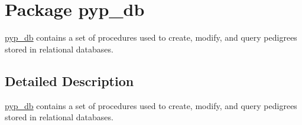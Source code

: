 \hypertarget{namespacepyp__db}{
\section{Package pyp\_\-db}
\label{namespacepyp__db}
}


\hyperlink{namespacepyp__db}{pyp\_\-db} contains a set of procedures used to create, modify, and query pedigrees stored in relational databases.  




\subsection{Detailed Description}
\hyperlink{namespacepyp__db}{pyp\_\-db} contains a set of procedures used to create, modify, and query pedigrees stored in relational databases. 